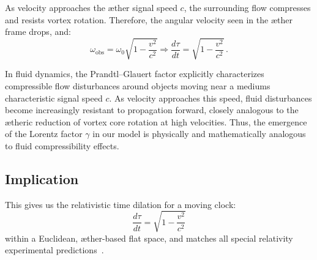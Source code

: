 As velocity approaches the æther signal speed $c$, the surrounding flow compresses and resists vortex rotation. Therefore, the angular velocity seen in the æther frame drops, and:
\[
\omega_\text{obs} = \omega_0 \sqrt{1 - \frac{v^2}{c^2}} \Rightarrow \frac{d\tau}{dt} = \sqrt{1 - \frac{v^2}{c^2}} \,. \tag{3}
\]


In fluid dynamics, the Prandtl–Glauert factor explicitly characterizes compressible flow disturbances around objects moving near a medium\rqs s characteristic signal speed $c$. As velocity approaches this speed, fluid disturbances become increasingly resistant to propagation forward, closely analogous to the ætheric reduction of vortex core rotation at high velocities. Thus, the emergence of the Lorentz factor $\gamma$ in our model is physically and mathematically analogous to fluid compressibility effects.


\subsection*{Implication}

This gives us the relativistic time dilation for a moving clock:
\[
\boxed{\frac{d\tau}{dt} = \sqrt{1 - \frac{v^2}{c^2}}}
\]
within a Euclidean, æther-based flat space, and matches all special relativity experimental predictions~\cite{Rado2020-æther-Lorentz,Levy2009-æther-clock}.